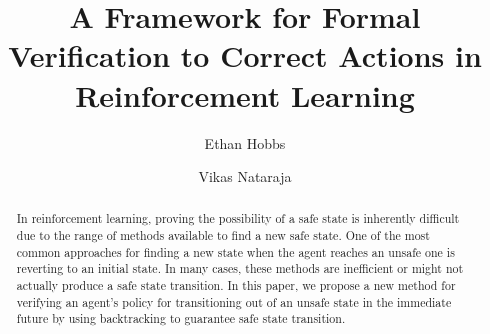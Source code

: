 \documentclass[acmsmall,review,authorversion]{acmart}
\begin{document}
\title{A Framework for Formal Verification to Correct Actions in Reinforcement Learning}

\author{Ethan Hobbs}
\author{Vikas Nataraja}



\begin{abstract}
In reinforcement learning, proving the possibility of a safe state is inherently difficult due to the range of methods available to find a new safe state. One of the most common approaches for finding a new state when the agent reaches an unsafe one is reverting to an initial state. In many cases, these methods are inefficient or might not actually produce a safe state transition. In this paper, we propose a new method for verifying an agent's policy for transitioning out of an unsafe state in the immediate future by using backtracking to guarantee safe state transition.
\end{abstract}

\maketitle
\end{document}
